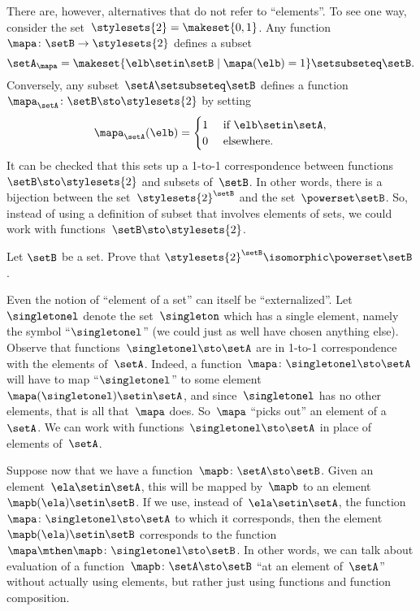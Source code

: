 There are, however, alternatives that do not refer to ``elements''.
To see one way, consider the set~$\stylesets{2} = \makeset{ 0, 1}$.
Any function~$\mapa \colon \setB \to \stylesets{2}$ defines a subset
\begin{equation}
    \setA_\mapa = \makeset{ \elb \setin\setB \mid \mapa(\elb) = 1 } \setsubseteq \setB.
\end{equation}
Conversely, any subset~$\setA \setsubseteq \setB$ defines a function~$\mapa_\setA \colon \setB \sto \stylesets{2}$ by setting
\begin{equation}
    \mapa_\setA(\elb) = \begin{cases}
        1 & \text{ if }\elb\setin\setA, \\
        0 & \text{ elsewhere}.
    \end{cases}
\end{equation}
It can be checked that this sets up a 1-to-1 correspondence between functions~$\setB \sto \stylesets{2}$ and subsets of~$\setB$.
In other words, there is a bijection between the set~$\stylesets{2}^\setB$ and the set~$\powerset \setB$.
So, instead of using a definition of subset that involves elements of sets, we could work with functions~$\setB \sto \stylesets{2}$.

\begin{gradedexercise}
    \label{ex:SubsetsAsFunctions}

    Let $\setB$ be a set.
    Prove that $\stylesets{2}^\setB \isomorphic \powerset \setB$.
\end{gradedexercise}


Even the notion of ``element of a set'' can itself be ``externalized''.
Let~$\singletonel$ denote the set~$\singleton$ which has a single element, namely the symbol ``$\singletonel$'' (we could just as well have chosen anything else).
Observe that functions~$\singletonel \sto \setA$ are in 1-to-1 correspondence with the elements of~$\setA$.
Indeed, a function~$\mapa\colon \singletonel \sto \setA$ will have to map ``$\singletonel$'' to some element~$\mapa(\singletonel) \setin\setA$, and since~$\singletonel$ has no other elements, that is all that~$\mapa$ does.
So~$\mapa$ ``picks out'' an element of a~$\setA$.
We can work with functions~$\singletonel \sto \setA$ in place of elements of~$\setA$.

Suppose now that we have a function~$\mapb \colon \setA \sto \setB$.
Given an element~$\ela \setin\setA$, this will be mapped by~$\mapb$ to an element~$\mapb(\ela) \setin\setB$.
If we use, instead of~$\ela \setin\setA$, the function~$\mapa \colon \singletonel \sto \setA$ to which it corresponds, then the element~$\mapb(\ela) \setin\setB$ corresponds to the function~$\mapa \mthen \mapb\colon \singletonel \sto \setB$.
In other words, we can talk about evaluation of a function~$\mapb \colon \setA \sto \setB$ ``at an element of~$\setA$'' without actually using elements, but rather just using functions and function composition.
